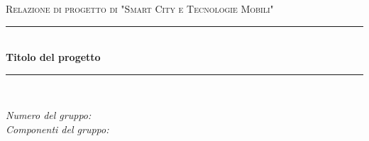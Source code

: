 \documentclass[12pt]{article}
\begin{document}

\begin{titlepage}

\newcommand{\HRule}{\rule{\linewidth}{0.5mm}}

\center

\textsc{\Large Relazione di progetto di "Smart City e Tecnologie Mobili"}\\[0.5cm]

\HRule \\[0.4cm]
{ \huge \bfseries Titolo del progetto}\\[0.4cm]
\HRule \\[1.5cm]

\vfill

\begin{flushleft}
\emph{Numero del gruppo:}\\[1cm]
\emph{Componenti del gruppo:}\\[3cm]
\end{flushleft}



\end{titlepage}


\tableofcontents

\newpage












\end{document}
